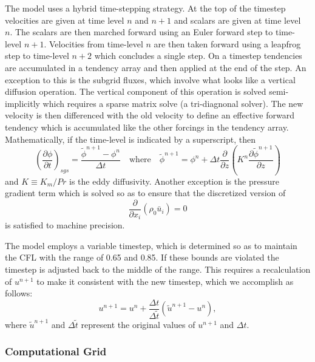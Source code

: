 \documentclass[11pt,a4paper]{article}
\begin{document}
The model uses a hybrid time-stepping strategy.  At the top of the
timestep velocities are given at time level $n$ and $n+1$ and scalars
are given at time level $n.$ The scalars are then marched forward
using an Euler forward step to time-level $n+1.$ Velocities from
time-level $n$ are then taken forward using a leapfrog step to
time-level $n+2$ which concludes a single step.  On a timestep
tendencies are accumulated in a tendency array and then applied at the
end of the step.  An exception to this is the subgrid fluxes, which
involve what looks like a vertical diffusion operation.  The vertical
component of this operation is solved semi-implicitly which requires a
sparse matrix solve (a tri-diagnonal solver).  The new velocity is
then differenced with the old velocity to define an effective forward
tendency which is accumulated like the other forcings in the tendency
array.  Mathematically, if the time-level is indicated by a
superscript, then
\begin{equation}
\left( \frac{\partial \phi}{\partial t} \right)_{sgs} =
\frac{\tilde{\phi}^{n+1} - \phi^n}{\Delta t} \quad \text{where} \quad
\tilde{\phi}^{n+1} = \phi^n + \Delta t \frac{\partial}{\partial z}
\left(K^n \frac{\partial \tilde{\phi}^{n+1}} {\partial z} \right)
\end{equation}
and $K \equiv K_m/Pr$ is the eddy diffusivity.  Another exception is
the pressure gradient term which is solved so as to ensure that the
discretized version of
\begin{equation}
\frac{\partial}{\partial x_i} \left( \rho_0 \bar{u}_i\right) = 0
\end{equation}
is satisfied to machine precision.

The model employs a variable timestep, which is determined so as to
maintain the CFL with the range of 0.65 and 0.85.  If these bounds are
violated the timestep is adjusted back to the middle of the range.
This requires a recalculation of $u^{n+1}$ to make it consistent with
the new timestep, which we accomplish as follows:
\begin{equation} u^{n+1} = u^n +
  \frac{\Delta t} { \Delta \tilde{t} } ( \tilde{u}^{n+1} - u^n),
\end{equation} where $\tilde{u}^{n+1}$ and $\Delta \tilde{t}$ represent the
original values of $u^{n+1}$ and $\Delta t.$

\subsubsection{Computational Grid}
\end{document}
